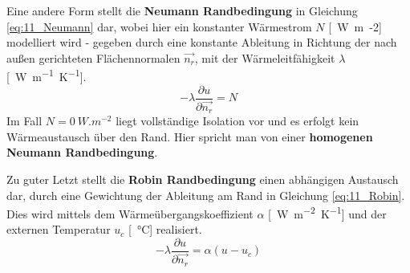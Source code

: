 Eine andere Form stellt die \textbf{Neumann Randbedingung} in Gleichung \ref{eq:11_Neumann} dar, wobei hier ein konstanter Wärmestrom $N$ [\SI{}{W.m{-2}}] modelliert wird - gegeben durch eine konstante Ableitung in Richtung der nach außen gerichteten Flächennormalen $\vec{n_r}$, mit der Wärmeleitfähigkeit $\lambda$ [\SI{}{W.m^{-1}.K^{-1}}].
\begin{equation}
\label{eq:11_Neumann}
-\lambda \frac{\partial u}{\partial\vec{n_r}} = N
\end{equation}
Im Fall $N = \SI{0}{W.m^{-2}}$ liegt vollständige Isolation vor und es erfolgt kein Wärmeaustausch über den Rand. Hier spricht man von einer \textbf{homogenen Neumann Randbedingung}.

Zu guter Letzt stellt die \textbf{Robin Randbedingung} einen abhängigen Austausch dar, durch eine Gewichtung der Ableitung am Rand in Gleichung \ref{eq:11_Robin}. Dies wird mittels dem Wärmeübergangskoeffizient $\alpha$  [\SI{}{W.m^{-2}.K^{-1}}] und der externen Temperatur $u_c$ [\SI{}{\celsius}] realisiert. 
\begin{equation}
\label{eq:11_Robin}
-\lambda \frac{\partial u}{\partial\vec{n_r}} = \alpha(u-u_c)
\end{equation}


\newpage
